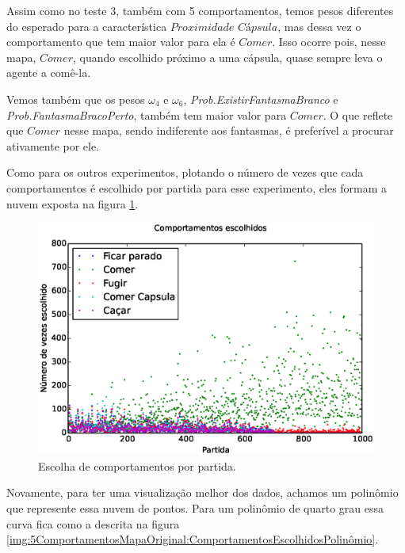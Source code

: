 Assim como no teste 3, também com 5 comportamentos, temos pesos diferentes do esperado para a característica $ \textit{Proximidade Cápsula} $, mas dessa vez o comportamento que tem maior valor para ela é $ Comer $. Isso ocorre pois, nesse mapa, $ Comer $, quando escolhido próximo a uma cápsula, quase sempre leva o agente a comê-la.

Vemos também que os pesos $ \omega_4 $ e $ \omega_6 $, \textit{Prob.ExistirFantasmaBranco} e \textit{Prob.FantasmaBracoPerto}, também tem maior valor para $ Comer $. O que reflete que $ Comer $ nesse mapa, sendo indiferente aos fantasmas, é preferível a procurar ativamente por ele.

Como para os outros experimentos, plotando o número de vezes que cada comportamentos é escolhido por partida para esse experimento, eles formam a nuvem exposta na figura \ref{img:5ComportamentosMapaOriginal:ComportamentosEscolhidos}.

\begin{figure}[H]
    \centering
    \includegraphics[width=\linewidth]{images/5_behaviors_original_map/chosen_behaviors}
    \caption{Escolha de comportamentos por partida.}
    \label{img:5ComportamentosMapaOriginal:ComportamentosEscolhidos}
\end{figure}

Novamente, para ter uma visualização melhor dos dados, achamos um polinômio que represente essa nuvem de pontos. Para um polinômio de quarto grau essa curva fica como a descrita na figura \ref{img:5ComportamentosMapaOriginal:ComportamentosEscolhidosPolinômio}.

